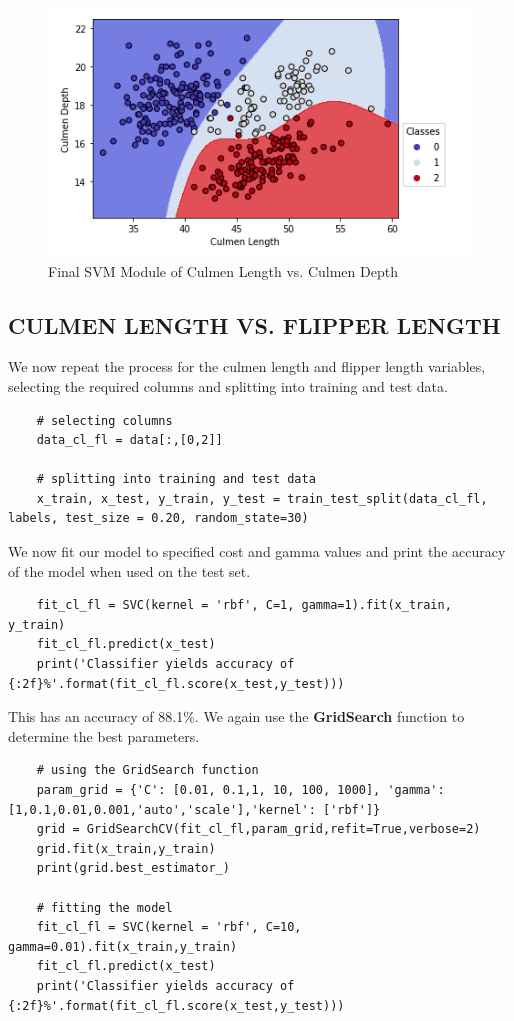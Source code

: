 \documentclass[12pt]{article}
\begin{document}
\begin{figure}[H]
    \centering
    \includegraphics[width=5in]{Figures/penguins/fit_cl_cd.png}
    \caption{Final SVM Module of Culmen Length vs. Culmen Depth}
    \label{fig_fit_cl_cd}
\end{figure}

\subsection{CULMEN LENGTH VS. FLIPPER LENGTH}

We now repeat the process for the culmen length and flipper length variables, selecting the required columns and splitting into training and test data.

\begin{verbatim}
    # selecting columns
    data_cl_fl = data[:,[0,2]]

    # splitting into training and test data
    x_train, x_test, y_train, y_test = train_test_split(data_cl_fl, labels, test_size = 0.20, random_state=30)
\end{verbatim}

We now fit our model to specified cost and gamma values and print the accuracy of the model when used on the test set.

\begin{verbatim}
    fit_cl_fl = SVC(kernel = 'rbf', C=1, gamma=1).fit(x_train, y_train)
    fit_cl_fl.predict(x_test)
    print('Classifier yields accuracy of {:2f}%'.format(fit_cl_fl.score(x_test,y_test)))  
\end{verbatim}

This has an accuracy of 88.1\%. We again use the \textbf{GridSearch} function to determine the best parameters.

\begin{verbatim}
    # using the GridSearch function
    param_grid = {'C': [0.01, 0.1,1, 10, 100, 1000], 'gamma': [1,0.1,0.01,0.001,'auto','scale'],'kernel': ['rbf']}
    grid = GridSearchCV(fit_cl_fl,param_grid,refit=True,verbose=2)
    grid.fit(x_train,y_train)
    print(grid.best_estimator_)
    
    # fitting the model
    fit_cl_fl = SVC(kernel = 'rbf', C=10, gamma=0.01).fit(x_train,y_train)
    fit_cl_fl.predict(x_test)
    print('Classifier yields accuracy of {:2f}%'.format(fit_cl_fl.score(x_test,y_test)))
\end{verbatim}
\end{document}
